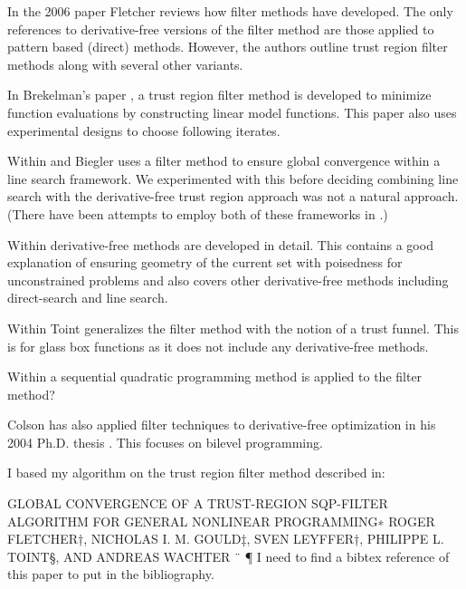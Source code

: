 \documentclass{article}
\begin{document}
In the 2006 paper \cite{DUMMY:Fletcher} Fletcher reviews how filter methods have developed.
The only references to derivative-free versions of the filter method are those applied to pattern based (direct) methods.
However, the authors outline trust region filter methods along with several other variants.

In Brekelman's paper \cite{DUMMY:Brekelman}, a trust region filter method is developed to minimize function evaluations by constructing linear model functions.
This paper also uses experimental designs to choose following iterates.


Within \cite{DUMMY:linesearch_global} and \cite{DUMMY:linesearch_local} Biegler uses a filter method to ensure global convergence within a line search framework.
We experimented with this before deciding combining line search with the derivative-free trust region approach was not a natural approach. (There have been attempts to employ both of these frameworks in \cite{DUMMY:CombineTrustAndLine}.)


Within  \cite{DUMMY:intro_book} derivative-free methods are developed in detail.
This contains a good explanation of ensuring geometry of the current set with poisedness for unconstrained problems and also covers other derivative-free methods including direct-search and line search.


Within \cite{DUMMY:trust_funnel_dfo} Toint generalizes the filter method with the notion of a trust funnel.
This is for glass box functions as it does not include any derivative-free methods.


Within \cite{DUMMY:sqp_filter} a sequential quadratic programming method is applied to the filter method?


Colson has also applied filter techniques to derivative-free optimization in his 2004 Ph.D. thesis \cite{Colson2004}.
This focuses on bilevel programming.


I based my algorithm on the trust region filter method described in:

GLOBAL CONVERGENCE OF A TRUST-REGION SQP-FILTER
ALGORITHM FOR GENERAL NONLINEAR PROGRAMMING∗
ROGER FLETCHER†, NICHOLAS I. M. GOULD‡, SVEN LEYFFER†,
PHILIPPE L. TOINT§, AND ANDREAS WACHTER ¨ ¶
I need to find a bibtex reference of this paper to put in the bibliography.



\end{document}
